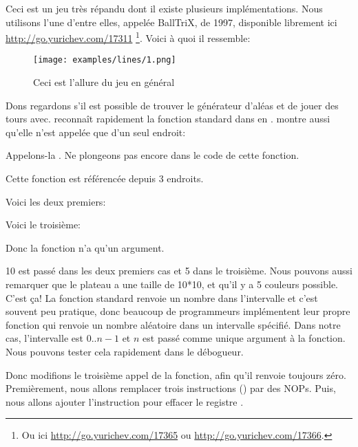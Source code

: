 \clearpage
{}
\label{chap:color_lines}

Ceci est un jeu très répandu dont il existe plusieurs implémentations. Nous utilisons
l'une d'entre elles, appelée BallTriX, de 1997, disponible librement ici \url{http://go.yurichev.com/17311}
\footnote{Ou ici \url{http://go.yurichev.com/17365} ou \url{http://go.yurichev.com/17366}.}.
Voici à quoi il ressemble:%

\begin{figure}[H]
\centering
\texttt{[image: examples/lines/1.png]}
\caption{Ceci est l'allure du jeu en général}
\label{fig:lines_1}
\end{figure}

\clearpage
{}

Dons regardons s'il est possible de trouver le générateur d'aléas et de jouer des tours avec.
\IDA reconnaît rapidement la fonction standard  dans  en .
\IDA montre aussi qu'elle n'est appelée que d'un seul endroit:



Appelons-la .
Ne plongeons pas encore dans le code de cette fonction.

Cette fonction est référencée depuis 3 endroits.

Voici les deux premiers:



Voici le troisième:



Donc la fonction n'a qu'un argument.

10 est passé dans les deux premiers cas et 5 dans le troisième.
Nous pouvons aussi remarquer que le plateau a une taille de 10*10, et qu'il y a 5
couleurs possible.
C'est ça!
La fonction standard  renvoie un nombre dans l'intervalle 
et c'est souvent peu pratique, donc beaucoup de programmeurs implémentent leur propre
fonction qui renvoie un nombre aléatoire dans un intervalle spécifié.
Dans notre cas, l'intervalle est $0..n-1$ et $n$ est passé comme unique argument
à la fonction.
Nous pouvons tester cela rapidement dans le débogueur.

Donc modifions le troisième appel de la fonction, afin qu'il renvoie toujours zéro.
Premièrement, nous allons remplacer trois instructions () par des \ac{NOP}s.
Puis, nous allons ajouter l'instruction  pour effacer le registre
\EAX.

